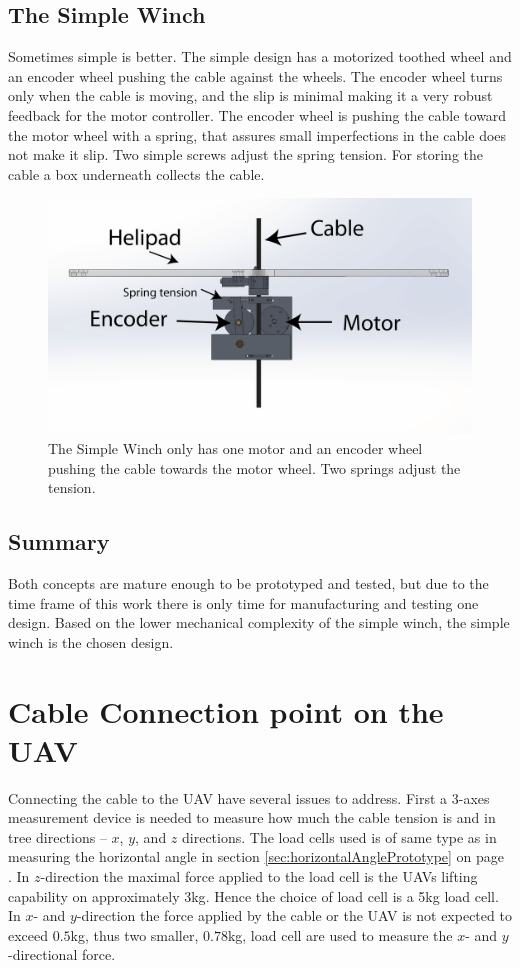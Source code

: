\subsection{The Simple Winch}
Sometimes simple is better. The simple design has a motorized toothed wheel and an encoder wheel pushing the cable against the wheels. The encoder wheel turns only when the cable is moving, and the slip is minimal making it a very robust feedback for the motor controller. The encoder wheel is pushing the cable toward the motor wheel with a spring, that assures small imperfections in the cable does not make it slip. Two simple screws adjust the spring tension. For storing the cable a box underneath collects the cable.

\begin{figure}[H]
\centering
\includegraphics[scale=0.75]{graphics/cad/winch.png}
\caption[The Simple Winch]{The Simple Winch only has one motor and an encoder wheel pushing the cable towards the motor wheel. Two springs adjust the tension.}
\label{fig:winch}
\end{figure}

\subsection{Summary}
Both concepts are mature enough to be prototyped and tested, but due to the time frame of this work there is only time for manufacturing and testing one design. Based on the lower mechanical complexity of the simple winch, the simple winch is the chosen design.    


\section{Cable Connection point on the UAV}
Connecting the cable to the UAV have several issues to address. First a 3-axes measurement device is needed to measure how much the cable tension is and in tree directions -- $x$, $y$, and $z$ directions. The load cells used is of same type as in measuring the horizontal angle in section \ref{sec:horizontalAnglePrototype} on page \pageref{sec:horizontalAnglePrototype}. In $z$-direction the maximal force applied to the load cell is the UAVs lifting capability on approximately 3kg\cite{Sidea2013}. Hence the choice of load cell is a 5kg load cell.\\
\noindent
In $x$- and $y$-direction the force applied by the cable or the UAV is not expected to exceed $0.5$kg, thus two smaller, $0.78$kg, load cell are used to measure the $x$- and $y$-directional force. 

